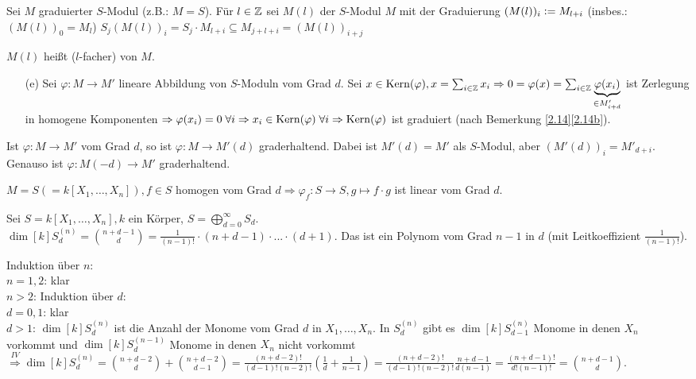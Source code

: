 \documentclass[a4paper, 10pt]{report}
\begin{document}
\begin{nnBsp}
Sei $M$ graduierter $S$-Modul (z.B.: $M=S$). Für $l\in\mathbb{Z}$ sei
$M(l)$ der $S$-Modul $M$ mit der Graduierung $(M(l))_i\mathrel{\mathop:}= M_{l+i}$
(insbes.: $(M(l))_0=M_l$)
$S_j(M(l))_i=S_j\cdot M_{l+i}\subseteq M_{j+l+i}=(M(l))_{i+j}$

$M(l)$ heißt ($l$-facher)  von $M$.
\end{nnBsp}

\begin{Bew}
  \begin{enumerate}
    \item[(e)] Sei $\varphi: M \to M'$ lineare Abbildung von $S$-Moduln vom Grad
    $d$. Sei $x \in \mathrm{Kern}(\varphi), x = \sum_{i \in \mathbb{Z}} x_i
    \Rightarrow 0 = \varphi(x) = \sum_{i \in \mathbb{Z}} \underset{\in M'_{i +
    d}}{\underbrace{\varphi(x_i)}}$ ist Zerlegung in homogene Komponenten
    $\Rightarrow \varphi(x_i) = 0 \; \forall i \Rightarrow x_i \in \mathrm{Kern}(\varphi) \; \forall i \Rightarrow \mathrm{Kern}(\varphi)$ ist graduiert
    (nach Bemerkung \ref{2.14}\ref{2.14b}).
  \end{enumerate}
\end{Bew}

\begin{Beo}
  Ist $\varphi: M \to M'$ vom Grad $d$, so ist $\varphi: M \to M'(d)$
  graderhaltend. Dabei ist $M'(d) = M'$ als $S$-Modul, aber $(M'(d))_i = M'_{d
  +i}$. Genauso ist $\varphi: M(-d) \to M'$ graderhaltend.
\end{Beo}

\begin{nnBsp}
  $M = S (=k[X_1, \dots, X_n]), f \in S$ homogen vom Grad $d \Rightarrow
  \varphi_f: S \to S, g \mapsto f \cdot g$ ist linear vom Grad $d$.
\end{nnBsp}

\begin{Prop}
  Sei $S = k[X_1, \dots, X_n], k$ ein Körper, $S = \bigoplus_{d = 0}^{\infty} S_d$.\\
  $\dim[k]{S_d^{(n)}} = \binom{n+d-1}{d} = \frac{1}{(n-1)!} \cdot (n+d-1)
  \cdot ... 
  \cdot (d+1)$. Das ist ein Polynom vom Grad $n-1$ in $d$ (mit Leitkoeffizient
  $\frac{1}{(n-1)!}$).
\end{Prop}

\begin{Bew}
  Induktion über $n$:\\
  $n=1,2$: klar\\
  $n>2$:  Induktion über $d$:\\
  $d=0,1$: klar\\
  $d>1$: $\dim[k]{S_d^{(n)}}$ ist die Anzahl der Monome vom Grad $d$ in $X_1, \dots,
  X_n$. In $S_d^{(n)}$ gibt es $\dim[k]{S_{d-1}^{(n)}}$ Monome in denen $X_n$ vorkommt und $\dim[k]{S_d^{(n-1)}}$ Monome in denen $X_n$ nicht
  vorkommt $\overset{IV}{\Rightarrow}
  \dim[k]{S_d^{(n)}} = \binom{n+d-2}{d} +
  \binom{n+d-2}{d-1} = \frac{(n+d-2)!}{(d-1)! (n-2)!} (\frac{1}{d} + \frac{1}{n-1}) =
  \frac{(n+d-2)!}{(d-1)! (n-2)!} \frac{n+d-1}{d(n-1)} = \frac{(n+d-1)!}{d!
  (n-1)!} = \binom{n+d-1}{d}$.
\end{Bew}
\end{document}
